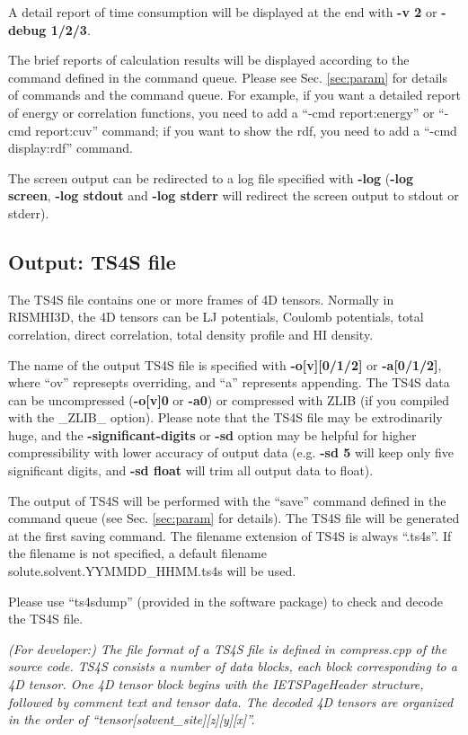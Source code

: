 \documentclass[aip,amsmath,amssymb,reprint,onecolumn]{revtex4-1}
\begin{document}
A detail report of time consumption will be displayed at the end with {\bf -v 2} or {\bf -debug 1/2/3}.

The brief reports of calculation results will be displayed according to the command defined in the command queue. Please see Sec. \ref{sec:param} for details of commands and the command queue. For example, if you want a detailed report of energy or correlation functions, you need to add a ``-cmd report:energy'' or ``-cmd report:cuv'' command; if you want to show the rdf, you need to add a ``-cmd display:rdf'' command.

The screen output can be redirected to a log file specified with {\bf -log} ({\bf -log screen}, {\bf -log stdout} and {\bf -log stderr} will redirect the screen output to stdout or stderr).

\subsection{Output: TS4S file}\label{sec:io.ts4s}

The TS4S file contains one or more frames of 4D tensors. Normally in RISMHI3D, the 4D tensors can be LJ potentials, Coulomb potentials, total correlation, direct correlation, total density profile and HI density.

The name of the output TS4S file is specified with {\bf -o[v][0/1/2]} or {\bf -a[0/1/2]}, where ``ov'' represepts overriding, and ``a'' represents appending. The TS4S data can be uncompressed ({\bf -o[v]0} or {\bf -a0}) or compressed with ZLIB (if you compiled with the \_ZLIB\_ option). Please note that the TS4S file may be extrodinarily huge, and the {\bf -significant-digits} or {\bf -sd} option may be helpful for higher compressibility with lower accuracy of output data (e.g. {\bf -sd 5} will keep only five significant digits, and {\bf -sd float} will trim all output data to float).

The output of TS4S will be performed with the ``save'' command defined in the command queue (see Sec. \ref{sec:param} for details). The TS4S file will be generated at the first saving command. The filename extension of TS4S is always ``.ts4s''. If the filename is not specified, a default filename solute.solvent.YYMMDD\_HHMM.ts4s will be used.

Please use ``ts4sdump'' (provided in the software package) to check and decode the TS4S file.

{\it (For developer:) The file format of a TS4S file is defined in compress.cpp of the source code. TS4S consists a number of data blocks, each block corresponding to a 4D tensor. One 4D tensor block begins with the IETSPageHeader structure, followed by comment text and tensor data. The decoded 4D tensors are organized in the order of ``tensor[solvent\_site][z][y][x]''.}
\end{document}
